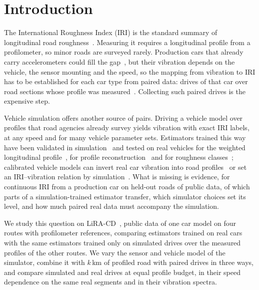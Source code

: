 \section{Introduction}
\label{sec:intro}
The International Roughness Index (IRI) is the standard summary of longitudinal road roughness~\cite{sayers1986tp45,astm_e1926}.
Measuring it requires a longitudinal profile from a profilometer, so minor roads are surveyed rarely.
Production cars that already carry accelerometers could fill the gap~\cite{sattar2018review,sang2024iri,levenberg2021lira}, but their vibration depends on the vehicle, the sensor mounting and the speed, so the mapping from vibration to IRI has to be established for each car type from paired data: drives of that car over road sections whose profile was measured~\cite{sayers1986tp46}.
Collecting such paired drives is the expensive step.

Vehicle simulation offers another source of pairs.
Driving a vehicle model over profiles that road agencies already survey yields vibration with exact IRI labels, at any speed and for many vehicle parameter sets.
Estimators trained this way have been validated in simulation~\cite{jeong2020cnn,rcnn2023sim} and tested on real vehicles for the weighted longitudinal profile~\cite{nitsche2014wlp}, for profile reconstruction~\cite{ngwangwa2014exp} and for roughness classes~\cite{speedadaptive2025}; calibrated vehicle models can invert real car vibration into road profiles~\cite{skar2024inversion,agebjar2025fusion} or set an IRI--vibration relation by simulation~\cite{wu2023calib}.
What is missing is evidence, for continuous IRI from a production car on held-out roads of public data, of which parts of a simulation-trained estimator transfer, which simulator choices set its level, and how much paired real data must accompany the simulation.

We study this question on LiRA-CD~\cite{skar2023lira}, public data of one car model on four routes with profilometer references, comparing estimators trained on real cars with the same estimators trained only on simulated drives over the measured profiles of the other routes.
We vary the sensor and vehicle model of the simulator, combine it with $k$\,km of profiled road with paired drives in three ways, and compare simulated and real drives at equal profile budget, in their speed dependence on the same real segments and in their vibration spectra.


